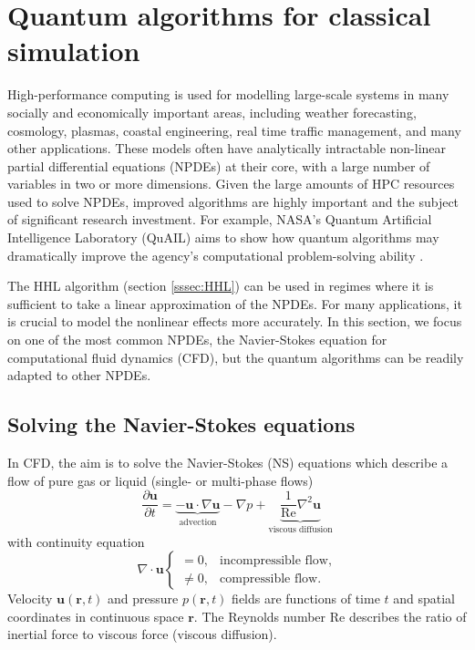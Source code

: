 \documentclass[10pt]{iopart}
\begin{document}

\section{Quantum algorithms for classical simulation}\label{sec:qfluid}

High-performance computing is used for modelling large-scale systems in many socially and economically important areas, including weather forecasting, cosmology, plasmas, coastal engineering, real time traffic management, and many other applications. These models often have analytically intractable non-linear partial differential equations (NPDEs) at their core, with a large number of variables in two or more dimensions.  Given the large amounts of HPC resources used to solve NPDEs, improved algorithms are highly important and the subject of significant research investment. For example, NASA's Quantum Artificial Intelligence Laboratory (QuAIL) aims to show how quantum algorithms may dramatically improve the agency's computational problem-solving ability \cite{Biswas2017,Rieffel2019}.

The HHL algorithm \cite{Harrow2009} (section \ref{sssec:HHL}) can be used in regimes where it is sufficient to take a linear approximation of the NPDEs. For many applications, it is crucial to model the nonlinear effects more accurately. In this section, we focus on one of the most common NPDEs, the Navier-Stokes equation for computational fluid dynamics (CFD), but the quantum algorithms can be readily adapted to other NPDEs.

\subsection{Solving the Navier-Stokes equations}

In CFD, the aim is to solve the Navier-Stokes (NS) equations which describe a flow of pure gas or liquid (single- or multi-phase flows)
\begin{equation}\label{eq:navierstokes}
\frac{\partial\mathbf{u}}{\partial t} = \underbrace{-\mathbf{u}\cdot\nabla\mathbf{u}}_\text{advection} - \nabla p + \underbrace{\frac{1}{\text{Re}}\nabla^2\mathbf{u}}_\text{viscous diffusion}
\end{equation}
with continuity equation 
\begin{equation}
\nabla\cdot\mathbf{u}
\begin{cases}
= 0, & \text{incompressible flow,} \\
\neq 0, & \text{compressible flow.} 
\end{cases}
\end{equation}
Velocity $\mathbf{u}(\mathbf{r},t)$ and pressure $p(\mathbf{r},t)$ fields are functions of time $t$ and spatial coordinates in continuous space $\mathbf{r}$. The Reynolds number Re describes the ratio of inertial force to viscous force (viscous diffusion). 
\end{document}
